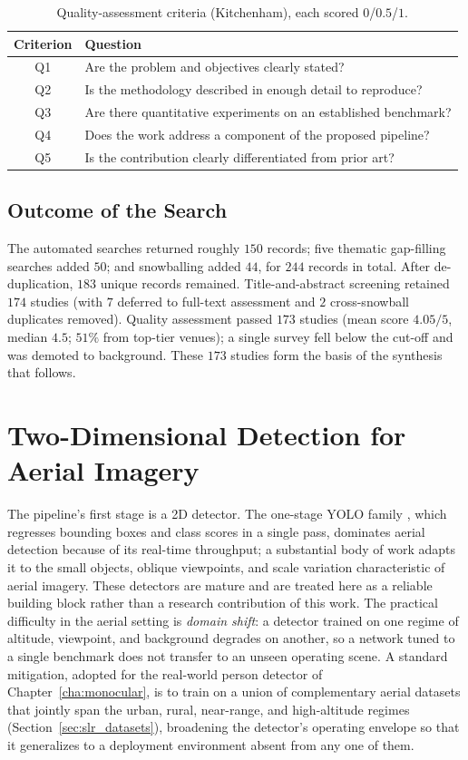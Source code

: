 \begin{table}[H]
  \centering
  \caption{Quality-assessment criteria (Kitchenham), each scored $0$/$0.5$/$1$.}
  \label{tab:qa}
  \begin{tabular}{@{}cl@{}}
    \toprule
    Criterion & Question \\
    \midrule
    Q1 & Are the problem and objectives clearly stated? \\
    Q2 & Is the methodology described in enough detail to reproduce? \\
    Q3 & Are there quantitative experiments on an established benchmark? \\
    Q4 & Does the work address a component of the proposed pipeline? \\
    Q5 & Is the contribution clearly differentiated from prior art? \\
    \bottomrule
  \end{tabular}
\end{table}

\subsection{Outcome of the Search}

The automated searches returned roughly $150$ records; five thematic
gap-filling searches added $50$; and snowballing added $44$, for $244$ records
in total. After de-duplication, $183$ unique records remained. Title-and-abstract
screening retained $174$ studies (with $7$ deferred to full-text assessment and
$2$ cross-snowball duplicates removed). Quality assessment passed $173$ studies
(mean score $4.05/5$, median $4.5$; $51\%$ from top-tier venues); a single survey
fell below the cut-off and was demoted to background. These $173$ studies form
the basis of the synthesis that follows.

\section{Two-Dimensional Detection for Aerial Imagery}

The pipeline's first stage is a 2D detector. The one-stage YOLO family
\cite{redmon2016yolo}, which regresses bounding boxes and class scores in a
single pass, dominates aerial detection because of its real-time throughput; a
substantial body of work adapts it to the small objects, oblique viewpoints, and
scale variation characteristic of aerial imagery. These detectors are mature and
are treated here as a reliable building block rather than a research
contribution of this work. The practical difficulty in the aerial setting is
\emph{domain shift}: a detector trained on one regime of altitude, viewpoint, and
background degrades on another, so a network tuned to a single benchmark does not
transfer to an unseen operating scene. A standard mitigation, adopted for the
real-world person detector of Chapter~\ref{cha:monocular}, is to train on a union
of complementary aerial datasets that jointly span the urban, rural, near-range,
and high-altitude regimes (Section~\ref{sec:slr_datasets}), broadening the
detector's operating envelope so that it generalizes to a deployment environment
absent from any one of them.

